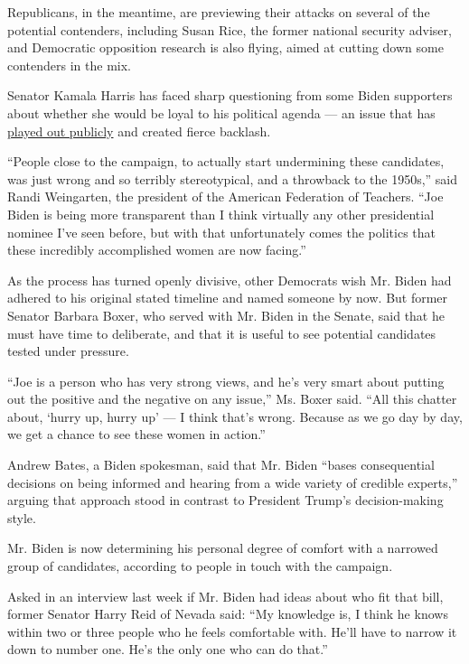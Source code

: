 Republicans, in the meantime, are previewing their attacks on several of
the potential contenders, including Susan Rice, the former national
security adviser, and Democratic opposition research is also flying,
aimed at cutting down some contenders in the mix.

Senator Kamala Harris has faced sharp questioning from some Biden
supporters about whether she would be loyal to his political agenda ---
an issue that has
\href{https://www.nytimes3xbfgragh.onion/2020/07/31/us/politics/joseph-biden-vice-president.html}{played
out publicly} and created fierce backlash.

``People close to the campaign, to actually start undermining these
candidates, was just wrong and so terribly stereotypical, and a
throwback to the 1950s,'' said Randi Weingarten, the president of the
American Federation of Teachers. ``Joe Biden is being more transparent
than I think virtually any other presidential nominee I've seen before,
but with that unfortunately comes the politics that these incredibly
accomplished women are now facing.''

As the process has turned openly divisive, other Democrats wish Mr.
Biden had adhered to his original stated timeline and named someone by
now. But former Senator Barbara Boxer, who served with Mr. Biden in the
Senate, said that he must have time to deliberate, and that it is useful
to see potential candidates tested under pressure.

``Joe is a person who has very strong views, and he's very smart about
putting out the positive and the negative on any issue,'' Ms. Boxer
said. ``All this chatter about, `hurry up, hurry up' --- I think that's
wrong. Because as we go day by day, we get a chance to see these women
in action.''

Andrew Bates, a Biden spokesman, said that Mr. Biden ``bases
consequential decisions on being informed and hearing from a wide
variety of credible experts,'' arguing that approach stood in contrast
to President Trump's decision-making style.

Mr. Biden is now determining his personal degree of comfort with a
narrowed group of candidates, according to people in touch with the
campaign.

Asked in an interview last week if Mr. Biden had ideas about who fit
that bill, former Senator Harry Reid of Nevada said: ``My knowledge is,
I think he knows within two or three people who he feels comfortable
with. He'll have to narrow it down to number one. He's the only one who
can do that.''

